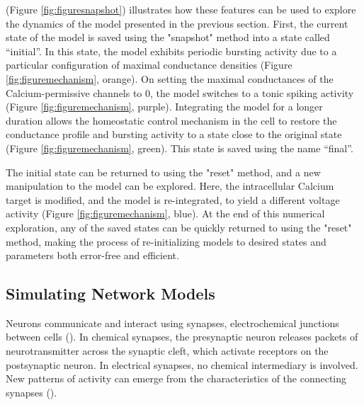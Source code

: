 \documentclass{frontiersSCNS} %
\begin{document}
(Figure \ref{fig:figuresnapshot}) illustrates how these features can be used to explore the dynamics of the model presented in the previous section. First, the current state of the model is saved using the "snapshot" method into a state called ``initial''. In this state, the model exhibits periodic bursting activity due to a particular configuration of maximal conductance densities (Figure \ref{fig:figuremechanism}, orange).  On setting the maximal conductances of the Calcium-permissive channels to 0, the model switches to a tonic spiking activity (Figure \ref{fig:figuremechanism}, purple). Integrating the model for a longer duration allows the homeostatic control mechanism in the cell to restore the conductance profile and bursting activity to a state close to the original state (Figure \ref{fig:figuremechanism}, green). This state is saved using the name ``final''.

The initial state can be returned to using the "reset" method, and a new manipulation to the model can be explored. Here, the intracellular Calcium target is modified, and the model is re-integrated, to yield a different voltage activity (Figure \ref{fig:figuremechanism}, blue). At the end of this numerical exploration, any of the saved states can be quickly returned to using the "reset" method, making the process of re-initializing models to desired states and parameters both error-free and efficient.




%
%
%
%
%
%



\subsection{Simulating Network Models}

Neurons communicate and interact using synapses, electrochemical junctions between cells (\cite{gjorgjievaComputationalImplicationsBiophysical2016, huaNeuralActivityDynamics2004}). In chemical synapses, the presynaptic neuron releases packets of neurotransmitter across the synaptic cleft, which activate receptors on the postsynaptic neuron. In electrical synapses, no chemical intermediary is involved. New patterns of activity can emerge from the characteristics of the connecting synapses (\cite{liComodulationSynapsesVoltagegated2018, nadimSynapticDepressionCreates1999, gutierrezRectifyingElectricalSynapses2013, gutierrezMultipleMechanismsSwitch2013}).
\end{document}
